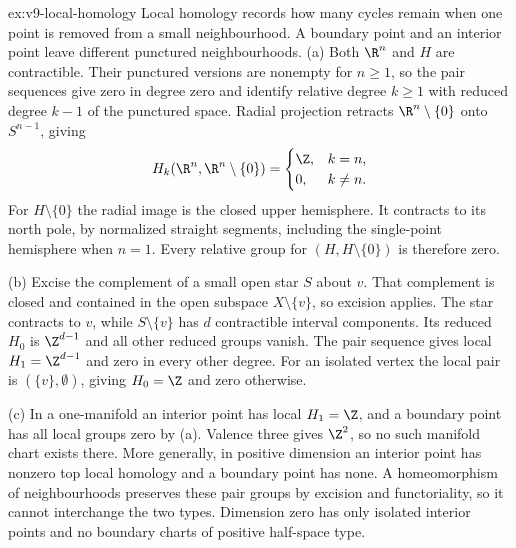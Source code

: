 \begin{solution}{ex:v9-local-homology}
\idea Local homology records how many cycles remain when one point is removed from a small neighbourhood. A boundary point and an interior point leave different punctured neighbourhoods.
\writeup (a) Both $\R^n$ and $H$ are contractible. Their punctured versions are nonempty for $n\ge1$, so the pair sequences give zero in degree zero and identify relative degree $k\ge1$ with reduced degree $k-1$ of the punctured space. Radial projection retracts $\R^n\setminus\{0\}$ onto $S^{n-1}$, giving
\[
H_k(\R^n,\R^n\setminus\{0\})=
\begin{cases}\Z,&k=n,\\0,&k\ne n.\end{cases}
\]
For $H\setminus\{0\}$ the radial image is the closed upper hemisphere. It contracts to its north pole, by normalized straight segments, including the single-point hemisphere when $n=1$. Every relative group for $(H,H\setminus\{0\})$ is therefore zero.

(b) Excise the complement of a small open star $S$ about $v$. That complement is closed and contained in the open subspace $X\setminus\{v\}$, so excision applies. The star contracts to $v$, while $S\setminus\{v\}$ has $d$ contractible interval components. Its reduced $H_0$ is $\Z^{d-1}$ and all other reduced groups vanish. The pair sequence gives local $H_1=\Z^{d-1}$ and zero in every other degree. For an isolated vertex the local pair is $(\{v\},\emptyset)$, giving $H_0=\Z$ and zero otherwise.

(c) In a one-manifold an interior point has local $H_1=\Z$, and a boundary point has all local groups zero by (a). Valence three gives $\Z^2$, so no such manifold chart exists there. More generally, in positive dimension an interior point has nonzero top local homology and a boundary point has none. A homeomorphism of neighbourhoods preserves these pair groups by excision and functoriality, so it cannot interchange the two types. Dimension zero has only isolated interior points and no boundary charts of positive half-space type.
\end{solution}

